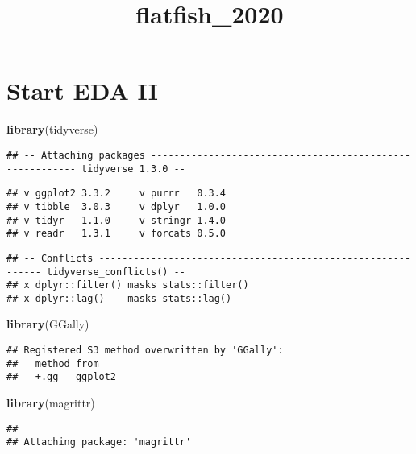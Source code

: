 \documentclass[
]{article}
\title{flatfish\_2020}
\author{}
\date{\vspace{-2.5em}}
\newenvironment{Shaded}{\begin{snugshade}}{\end{snugshade}}
\newcommand{\KeywordTok}[1]{\textcolor[rgb]{0.13,0.29,0.53}{\textbf{#1}}}
\newcommand{\NormalTok}[1]{#1}
\begin{document}
\maketitle

\hypertarget{start-eda-ii}{%
\section{Start EDA II}\label{start-eda-ii}}

\begin{Shaded}
\begin{Highlighting}[]
\KeywordTok{library}\NormalTok{(tidyverse)}
\end{Highlighting}
\end{Shaded}

\begin{verbatim}
## -- Attaching packages --------------------------------------------------------- tidyverse 1.3.0 --
\end{verbatim}

\begin{verbatim}
## v ggplot2 3.3.2     v purrr   0.3.4
## v tibble  3.0.3     v dplyr   1.0.0
## v tidyr   1.1.0     v stringr 1.4.0
## v readr   1.3.1     v forcats 0.5.0
\end{verbatim}

\begin{verbatim}
## -- Conflicts ------------------------------------------------------------ tidyverse_conflicts() --
## x dplyr::filter() masks stats::filter()
## x dplyr::lag()    masks stats::lag()
\end{verbatim}

\begin{Shaded}
\begin{Highlighting}[]
\KeywordTok{library}\NormalTok{(GGally)}
\end{Highlighting}
\end{Shaded}

\begin{verbatim}
## Registered S3 method overwritten by 'GGally':
##   method from   
##   +.gg   ggplot2
\end{verbatim}

\begin{Shaded}
\begin{Highlighting}[]
\KeywordTok{library}\NormalTok{(magrittr)}
\end{Highlighting}
\end{Shaded}

\begin{verbatim}
## 
## Attaching package: 'magrittr'
\end{verbatim}
\end{document}
